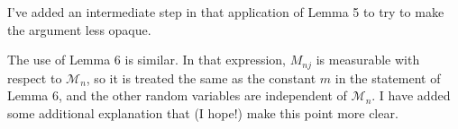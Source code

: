 \documentclass[12pt]{article}
\begin{document}
\begin{enumerate}
  I've added an intermediate step in that application of Lemma 5 to
  try to make the argument less opaque.

  The use of Lemma 6 is similar. In that expression, $M_{nj}$ is
  measurable with respect to $\mathcal{M}_n$, so it is treated the
  same as the constant $m$ in the statement of Lemma 6, and the other
  random variables are independent of $\mathcal{M}_n$. I have added
  some additional explanation that (I hope!) make this point more clear.

\end{enumerate}
\end{document}
